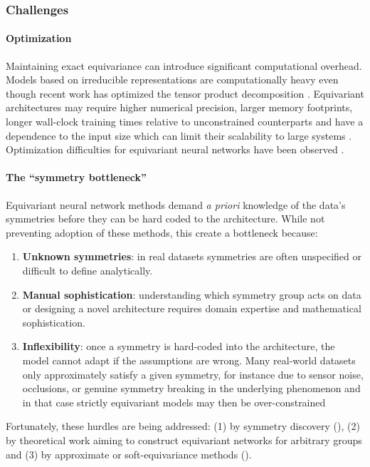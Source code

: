 \documentclass[mathematics,review,submit,moreauthors]{Definitions/mdpi}
\begin{document}
\subsubsection{Challenges}

\paragraph{Optimization}
Maintaining exact equivariance can introduce significant computational overhead.
Models based on irreducible representations are computationally heavy even though recent work has optimized the tensor product decomposition \cite{passaro2023,luo2024a}.
Equivariant architectures may require higher numerical precision, larger memory footprints, longer wall-clock training times relative to unconstrained counterparts and have a dependence to the input size which can limit their scalability to large systems \cite{bogatskiy2020p3icml}.
Optimization difficulties for equivariant neural networks have been observed \citep{pertigkiozoglou2024,lawrence2026}.

\paragraph{The ``symmetry bottleneck''}\label{par:sym-bottleneck}
Equivariant neural network methods demand \textit{a priori} knowledge of the data's symmetries before they can be hard coded to the architecture.
While not preventing adoption of these methods, this create a bottleneck because:
\begin{enumerate}
    \item \textbf{Unknown symmetries}: in real datasets symmetries are often unspecified or difficult to define analytically.
    \item \textbf{Manual sophistication}: understanding which symmetry group acts on data or designing a novel architecture requires domain expertise and mathematical sophistication.
    \item \textbf{Inflexibility}: once a symmetry is hard-coded into the architecture, the model cannot adapt if the assumptions are wrong.
    Many real-world datasets only approximately satisfy a given symmetry, for instance due to sensor noise, occlusions, or genuine symmetry breaking in the underlying phenomenon and in that case strictly equivariant models may then be over-constrained
\end{enumerate}
Fortunately, these hurdles are being addressed: (1) by symmetry discovery (), (2) by theoretical work aiming to construct equivariant networks for arbitrary groups and (3) by approximate or soft-equivariance methods ().
\end{document}
